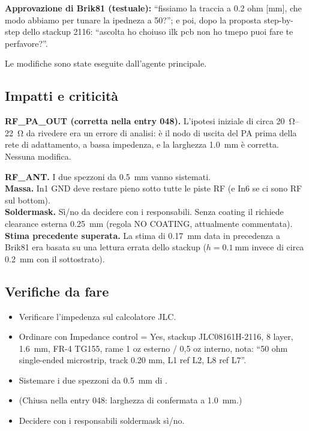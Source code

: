 \textbf{Approvazione di Brik81 (testuale):} ``fissiamo la traccia a 0.2 ohm [mm], che modo abbiamo per tunare la ipedneza a 50?''; e poi, dopo la proposta step-by-step dello stackup 2116: ``ascolta ho choiuso ilk pcb non ho tmepo puoi fare te perfavore?''.

Le modifiche sono state eseguite dall'agente principale.

\subsection{Impatti e criticità}
\begin{critbox}
\textbf{RF\_PA\_OUT (corretta nella entry 048).} L'ipotesi iniziale di circa \SIrange{20}{22}{\ohm} da rivedere era un errore di analisi:  è il nodo di uscita del PA prima della rete di adattamento, a bassa impedenza, e la larghezza \SI{1,0}{\milli\metre} è corretta. Nessuna modifica.
\end{critbox}
\begin{notebox}
\textbf{RF\_ANT.} I due spezzoni da \SI{0,5}{\milli\metre} vanno sistemati.\\
\textbf{Massa.} In1 GND deve restare pieno sotto tutte le piste RF (e In6 se ci sono RF sul bottom).\\
\textbf{Soldermask.} Sì/no da decidere con i responsabili. Senza coating il  richiede clearance esterna \SI{0,25}{\milli\metre} (regola NO COATING, attualmente commentata).\\
\textbf{Stima precedente superata.} La stima di \SI{0,17}{\milli\metre} data in precedenza a Brik81 era basata su una lettura errata dello stackup ($h=\SI{0,1}{\milli\metre}$ invece di circa \SI{0,2}{\milli\metre} con il sottostrato).
\end{notebox}

\subsection{Verifiche da fare}
\begin{itemize}
  \item Verificare l'impedenza sul calcolatore JLC.
  \item Ordinare con Impedance control = Yes, stackup JLC08161H-2116, 8 layer, \SI{1,6}{\milli\metre}, FR-4 TG155, rame 1 oz esterno / 0,5 oz interno, nota: ``50 ohm single-ended microstrip, track 0.20 mm, L1 ref L2, L8 ref L7''.
  \item Sistemare i due spezzoni da \SI{0,5}{\milli\metre} di .
  \item (Chiusa nella entry 048: larghezza di  confermata a \SI{1,0}{\milli\metre}.)
  \item Decidere con i responsabili soldermask sì/no.
\end{itemize}
